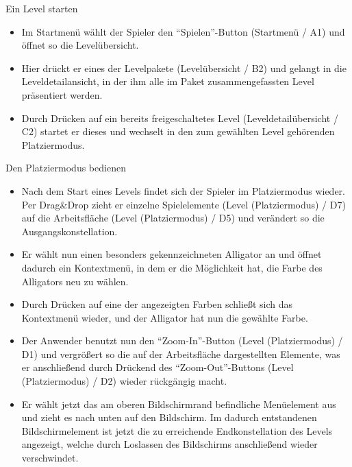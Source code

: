 \begin{requirements}
\begin{itemize}
	\end{itemize}
	

	 Ein Level starten
	
	
	\begin{itemize}
  			\item Im Startmenü wählt der Spieler den "`Spielen"'-Button (Startmenü / A1) und öffnet so die Levelübersicht.
  			
  			\item Hier drückt er eines der Levelpakete (Levelübersicht / B2) und gelangt in die Leveldetailansicht, in der ihm alle im Paket zusammengefassten Level präsentiert werden.
  			
  			\item Durch Drücken auf ein bereits freigeschaltetes Level (Leveldetailübersicht / C2) startet er dieses und wechselt in den zum gewählten Level gehörenden Platziermodus.
  	\end{itemize}
  	
  	
  	
  	 Den Platziermodus bedienen
  	
	
	\begin{itemize}
			\item Nach dem Start eines Levels findet sich der Spieler im Platziermodus wieder. Per Drag\&Drop zieht er einzelne Spielelemente (Level (Platziermodus) / D7) auf die Arbeitsfläche (Level (Platziermodus) / D5) und verändert so die Ausgangskonstellation.
  			
  			\item Er wählt nun einen besonders gekennzeichneten Alligator an und öffnet dadurch ein Kontextmenü, in dem er die Möglichkeit hat, die Farbe des Alligators neu zu wählen.
  			
  			\item Durch Drücken auf eine der angezeigten Farben schließt sich das Kontextmenü wieder, und der Alligator hat nun die gewählte Farbe.
  			
  			\item Der Anwender benutzt nun den "`Zoom-In"'-Button (Level (Platziermodus) / D1) und vergrößert so die auf der Arbeitsfläche dargestellten Elemente, was er anschließend durch Drückend des "`Zoom-Out"'-Buttons  (Level (Platziermodus) / D2) wieder rückgängig macht.
  			
  			\item Er wählt jetzt das am oberen Bildschirmrand befindliche Menüelement aus und zieht es nach unten auf den Bildschirm. Im dadurch entstandenen Bildschirmelement ist jetzt die zu erreichende Endkonstellation des Levels angezeigt, welche durch Loslassen des Bildschirms anschließend wieder verschwindet. 
  			

\end{itemize}
\end{requirements}
